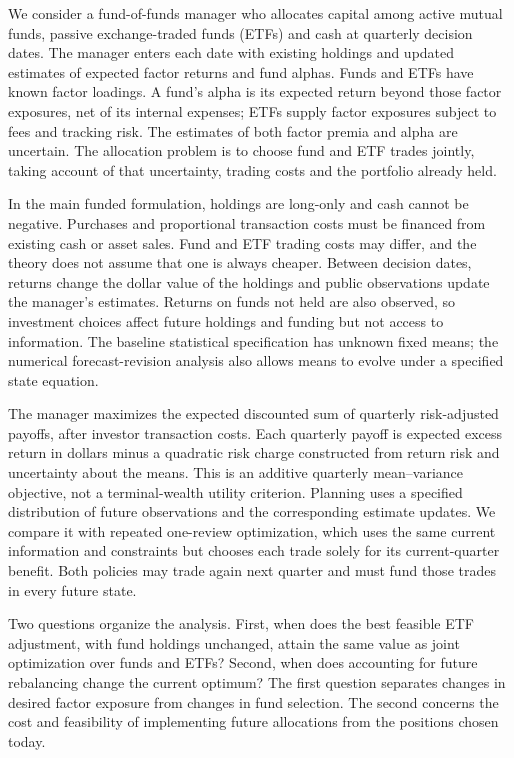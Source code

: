 \documentclass[11pt]{article}
\begin{document}
We consider a fund-of-funds manager who allocates capital among active mutual funds, passive exchange-traded funds (ETFs) and cash at quarterly decision dates. The manager enters each date with existing holdings and updated estimates of expected factor returns and fund alphas. Funds and ETFs have known factor loadings. A fund's alpha is its expected return beyond those factor exposures, net of its internal expenses; ETFs supply factor exposures subject to fees and tracking risk. The estimates of both factor premia and alpha are uncertain. The allocation problem is to choose fund and ETF trades jointly, taking account of that uncertainty, trading costs and the portfolio already held.

In the main funded formulation, holdings are long-only and cash cannot be negative. Purchases and proportional transaction costs must be financed from existing cash or asset sales. Fund and ETF trading costs may differ, and the theory does not assume that one is always cheaper. Between decision dates, returns change the dollar value of the holdings and public observations update the manager's estimates. Returns on funds not held are also observed, so investment choices affect future holdings and funding but not access to information. The baseline statistical specification has unknown fixed means; the numerical forecast-revision analysis also allows means to evolve under a specified state equation.

The manager maximizes the expected discounted sum of quarterly risk-adjusted payoffs, after investor transaction costs. Each quarterly payoff is expected excess return in dollars minus a quadratic risk charge constructed from return risk and uncertainty about the means. This is an additive quarterly mean--variance objective, not a terminal-wealth utility criterion. Planning uses a specified distribution of future observations and the corresponding estimate updates. We compare it with repeated one-review optimization, which uses the same current information and constraints but chooses each trade solely for its current-quarter benefit. Both policies may trade again next quarter and must fund those trades in every future state.

Two questions organize the analysis. First, when does the best feasible ETF adjustment, with fund holdings unchanged, attain the same value as joint optimization over funds and ETFs? Second, when does accounting for future rebalancing change the current optimum? The first question separates changes in desired factor exposure from changes in fund selection. The second concerns the cost and feasibility of implementing future allocations from the positions chosen today.
\end{document}
